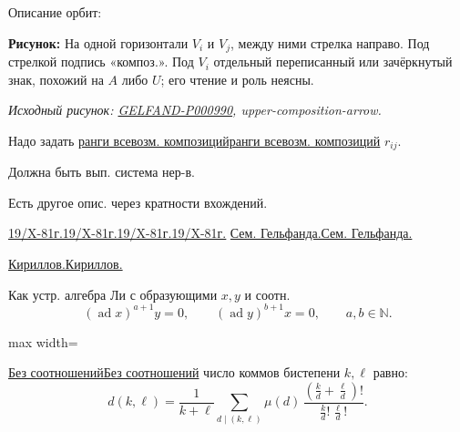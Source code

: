 \documentclass[11pt]{article}
\theoremstyle{definition}
\theoremstyle{remark}
\newcommand{\SourceFigure}[3]{%
  \par\begingroup\color{blue!60!black}\textbf{\hyperref[#1:source-page]{Source figure #1/#2}:} #3%
  \par\textit{Consult the authoritative scan at this locator.}\endgroup\par%
}
\renewcommand{\SourceFigure}[3]{%
  \par\begingroup\color{blue!55!black}\textbf{Рисунок:} #3%
  \par{\small\textit{Исходный рисунок: \hyperref[#1:source-page]{#1}, #2.}}%
  \endgroup\par%
}
\let\DiplomaticMathUnderline\underline
\renewcommand{\underline}[1]{\ifmmode\DiplomaticMathUnderline{#1}\else\uline{#1}\fi}
\begin{document}
Описание орбит:

\SourceFigure{GELFAND-P000990}{upper-composition-arrow}{На одной горизонтали $V_i$ и $V_j$, между ними стрелка направо. Под стрелкой подпись «композ.». Под $V_i$ отдельный переписанный или зачёркнутый знак, похожий на $A$ либо $U$; его чтение и роль неясны.}

Надо задать \underline{ранги всевозм. композиций} $r_{ij}$.

Должна быть вып. система нер-в.

Есть другое опис. через кратности вхождений.

\underline{\underline{19/X-81г.}} \underline{Сем. Гельфанда.}

\underline{Кириллов.}

Как устр. алгебра Ли с образующими $x,y$ и соотн.
\begin{equation*}
(\operatorname{ad}x)^{a+1}y=0,\qquad
(\operatorname{ad}y)^{b+1}x=0,\qquad a,b\in\mathbb{N}.
\end{equation*}

\begin{center}
\begin{adjustbox}{max width=\linewidth}
\end{adjustbox}
\end{center}

\underline{Без соотношений} число коммов бистепени $k,\ell$ равно:
\begin{equation*}
d(k,\ell)=\frac{1}{k+\ell}\sum_{d\mid(k,\ell)}
\mu(d)\,\frac{\left(\frac{k}{d}+\frac{\ell}{d}\right)!}
{\frac{k}{d}!\,\frac{\ell}{d}!}.
\end{equation*}
\end{document}
